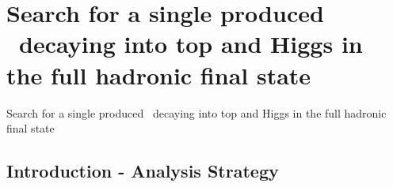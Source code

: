 \section[Analysis]{Search for a single produced \Tp~decaying into top and Higgs in the full hadronic final state}
\setcounter{tocdepth}{2}

\begin{frame}
\begin{center}
Search for a single produced \Tp~decaying into top and Higgs in the full hadronic final state
\end{center}
\end{frame}


\subsection{Introduction - Analysis Strategy}

